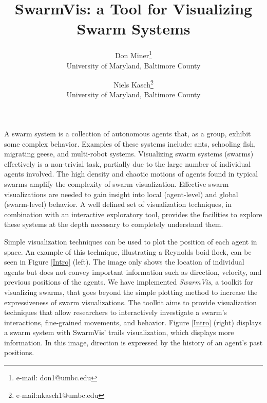 \documentclass{vgtc}
\title{SwarmVis: a Tool for Visualizing Swarm Systems}
\author{Don Miner\thanks{e-mail: don1@umbc.edu}\\ %
        \scriptsize University of Maryland, Baltimore County %
\and Niels Kasch\thanks{e-mail:nkasch1@umbc.edu}\\ %
     \scriptsize University of Maryland, Baltimore County %
}
\begin{document}

\maketitle

A swarm system is a collection of autonomous agents that, as a group, exhibit some complex behavior.
Examples of these systems include: ants\cite{couzin2003sol}, schooling fish\cite{parrish2002sof}, migrating geese\cite{reynolds1987}, 
and multi-robot systems\cite{mondada2004sbn}\cite{mclurkin2004srt}.
Visualizing swarm systems (swarms) effectively is a non-trivial task, partially due to the large number of individual agents involved.
The high density and chaotic motions of agents found in typical swarms amplify the complexity of swarm visualization.
Effective swarm visualizations are needed to gain insight into local (agent-level) and global (swarm-level) behavior.
A well defined set of visualization techniques, in combination with an interactive exploratory tool,
provides the facilities to explore these systems at the depth necessary to completely understand them.


Simple visualization techniques can be used to plot the position of each agent in space.
An example of this technique, illustrating a Reynolds boid flock\cite{reynolds1987}, can be seen in Figure \ref{Intro} (left).
The image only shows the location of individual agents but does not convey important
information such as direction, velocity, and previous positions of the agents.
We have implemented \textit{SwarmVis}, a toolkit for visualizing swarms,
that goes beyond the simple plotting method to increase the
expressiveness of swarm visualizations.
The toolkit aims to provide visualization techniques that allow researchers to interactively
investigate a swarm's interactions, fine-grained movements, and behavior.
Figure \ref{Intro} (right) displays a swarm system with SwarmVis' trails visualization, which displays more information.
In this image, direction is expressed by the history of an agent's past positions.
\end{document}
